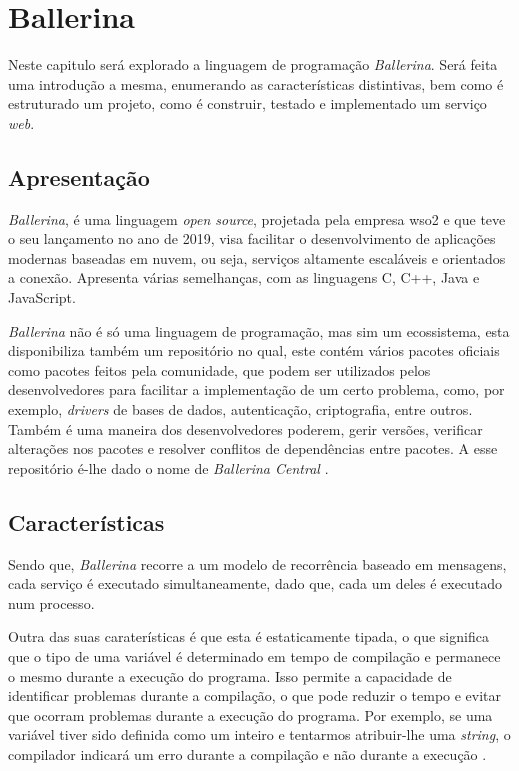 \chapter{Ballerina}	%
\label{Chapter3}

Neste capitulo será explorado a linguagem de programação \textit{Ballerina}. Será feita uma introdução a mesma, enumerando as características distintivas, bem como é estruturado um projeto, como é construir, testado e implementado um serviço \textit{web}.

\section{Apresentação}

\textit{Ballerina}, é uma linguagem \textit{open source}, projetada pela empresa \ac{wso2} e que teve o seu lançamento no ano de 2019, visa facilitar o desenvolvimento de aplicações modernas baseadas em nuvem, ou seja, serviços altamente escaláveis e orientados a conexão. Apresenta várias semelhanças, com as linguagens C, C++, Java e JavaScript.

\textit{Ballerina} não é só uma linguagem de programação, mas sim um ecossistema, esta disponibiliza também um repositório no qual, este contém vários pacotes oficiais como pacotes feitos pela comunidade, que podem ser utilizados pelos desenvolvedores para facilitar a implementação de um certo problema, como, por exemplo, \textit{drivers} de bases de dados, autenticação, criptografia, entre outros. Também é uma maneira dos desenvolvedores poderem, gerir versões, verificar alterações nos pacotes e resolver conflitos de dependências entre pacotes. A esse repositório é-lhe dado o nome de \textit{Ballerina Central} \cite{centralBallerina}.

\section{Características}

Sendo que, \textit{Ballerina} recorre a um modelo de recorrência baseado em mensagens, cada serviço é executado simultaneamente, dado que, cada um deles é executado num processo.

Outra das suas caraterísticas é que esta é estaticamente tipada, o que significa que o tipo de uma variável é determinado em tempo de compilação e permanece o mesmo durante a execução do programa. Isso permite a capacidade de identificar problemas durante a compilação, o que pode reduzir o tempo e evitar que ocorram problemas durante a execução do programa. Por exemplo, se uma variável tiver sido definida como um inteiro e tentarmos atribuir-lhe uma \textit{string}, o compilador indicará um erro durante a compilação e não durante a execução \cite{tiposBallerina}.

